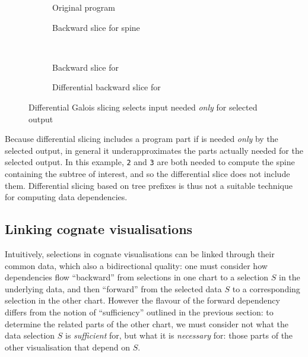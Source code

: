 \begin{figure}[H]
   \small
   \begin{centering}
      \begin{subfigure}{0.45\textwidth}
         {}
      \caption{Original program}
      \end{subfigure}
      \begin{subfigure}{0.45\textwidth}
         {}
      \caption{Backward slice for spine \kw{($\hole$, $\hole$)}}
      \end{subfigure}
      \\
      \begin{subfigure}{0.45\textwidth}
         {}
      \caption{Backward slice for }
      \end{subfigure}
      \begin{subfigure}{0.45\textwidth}
         {}
      \caption{Differential backward slice for }
      \end{subfigure}
   \end{centering}
   \caption{Differential Galois slicing selects input needed \emph{only} for selected output}
\end{figure}

\noindent Because differential slicing includes a program part if is needed \emph{only} by the selected output, in general it underapproximates the parts actually needed for the selected output. In this example, \lstinline{2} and \lstinline{3} are both needed to compute the spine containing the subtree of interest, and so the differential slice does not include them. Differential slicing based on tree prefixes is thus not a suitable technique for computing data dependencies.

\subsection{Linking cognate visualisations}

Intuitively, selections in cognate visualisations can be linked through their common data, which also a bidirectional quality: one must consider how dependencies flow ``backward'' from selections in one chart to a selection $S$ in the underlying data, and then ``forward'' from the selected data $S$ to a corresponding selection in the other chart. However the flavour of the forward dependency differs from the notion of ``sufficiency'' outlined in the previous section: to determine the related parts of the other chart, we must consider not what the data selection $S$ is \emph{sufficient} for, but what it is \emph{necessary} for: those parts of the other visualisation that depend on $S$.



